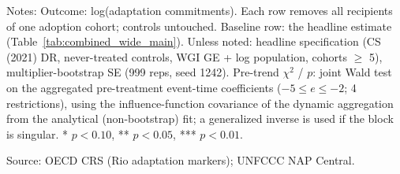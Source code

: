 \begin{table}[H]
\centering
\caption{Leave-one-cohort-out: headline ATT dropping each adoption cohort in turn}
\label{tab:att_loco}
\begingroup\small
{}
\endgroup
\par\vspace{4pt}
\begin{minipage}{\linewidth}\footnotesize
Notes: Outcome: log(adaptation commitments). Each row removes all recipients of one adoption cohort; controls untouched. Baseline row: the headline estimate (Table~\ref{tab:combined_wide_main}). Unless noted: headline specification (CS\,(2021) DR, never-treated controls, WGI GE + log population, cohorts $\geq$ 5), multiplier-bootstrap SE (999 reps, seed 1242). Pre-trend $\chi^2$ / $p$: joint Wald test on the aggregated pre-treatment event-time coefficients ($-5 \leq e \leq -2$; 4 restrictions), using the influence-function covariance of the dynamic aggregation from the analytical (non-bootstrap) fit; a generalized inverse is used if the block is singular. * $p<0.10$, ** $p<0.05$, *** $p<0.01$.\par
Source: OECD CRS (Rio adaptation markers); UNFCCC NAP Central.
\end{minipage}
\end{table}
